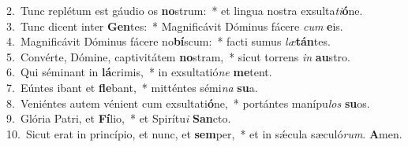 {2.~}Tunc replétum est gáudio os \textbf{no}strum:~* et lingua nostra exsulta\textit{ti}\textbf{ó}ne.\\
{3.~}Tunc dicent inter \textbf{Gen}tes:~* Magnificávit Dóminus fácere \textit{cum} \textbf{e}is.\\
{4.~}Magnificávit Dóminus fácere no\textbf{bí}scum:~* facti sumus \textit{læ}\textbf{tán}tes.\\
{5.~}Convérte, Dómine, captivitátem \textbf{no}stram,~* sicut torrens \textit{in} \textbf{au}stro.\\
{6.~}Qui séminant in \textbf{lá}crimis,~* in exsultatió\textit{ne} \textbf{me}tent.\\
{7.~}Eúntes ibant et \textbf{fle}bant,~* mitténtes sémi\textit{na} \textbf{su}a.\\
{8.~}Veniéntes autem vénient cum exsultati\textbf{ó}ne,~* portántes manípu\textit{los} \textbf{su}os.\\
{9.~}Glória Patri, et \textbf{Fí}lio,~* et Spirítu\textit{i} \textbf{San}cto.\\
{10.~}Sicut erat in princípio, et nunc, et \textbf{sem}per,~* et in sǽcula sæculó\textit{rum}. \textbf{A}men.\\
